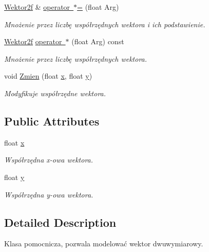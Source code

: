\begin{DoxyCompactItemize}
\mbox{\hyperlink{class_pz_g_1_1_wektor2f}{Wektor2f}} \& \mbox{\hyperlink{class_pz_g_1_1_wektor2f_aab3daec875a23c24b24cfc5d8fabb02b}{operator $\ast$=}} (float Arg)
\begin{DoxyCompactList}\small\item\em Mnożenie przez liczbę współrzędnych wektora i ich podstawienie. \end{DoxyCompactList}\item 
\mbox{\hyperlink{class_pz_g_1_1_wektor2f}{Wektor2f}} \mbox{\hyperlink{class_pz_g_1_1_wektor2f_a41c29776e710e4d6a88a61d2fed9aed4}{operator $\ast$}} (float Arg) const
\begin{DoxyCompactList}\small\item\em Mnożenie przez liczbę współrzędnych wektora. \end{DoxyCompactList}\item 
void \mbox{\hyperlink{class_pz_g_1_1_wektor2f_a2279ab3874a203d0a5b84d323c6876ec}{Zmien}} (float \mbox{\hyperlink{class_pz_g_1_1_wektor2f_aacbc07ae23c748a3378c09353b0b3c4c}{x}}, float \mbox{\hyperlink{class_pz_g_1_1_wektor2f_a7bea23077e29c234ff5b9fdc4f436fb8}{y}})
\begin{DoxyCompactList}\small\item\em Modyfikuje współrzędne wektora. \end{DoxyCompactList}\end{DoxyCompactItemize}
\subsection*{Public Attributes}
\begin{DoxyCompactItemize}
\item 
float \mbox{\hyperlink{class_pz_g_1_1_wektor2f_aacbc07ae23c748a3378c09353b0b3c4c}{x}}
\begin{DoxyCompactList}\small\item\em Współrzędna x-\/owa wektora. \end{DoxyCompactList}\item 
float \mbox{\hyperlink{class_pz_g_1_1_wektor2f_a7bea23077e29c234ff5b9fdc4f436fb8}{y}}
\begin{DoxyCompactList}\small\item\em Współrzędna y-\/owa wektora. \end{DoxyCompactList}\end{DoxyCompactItemize}


\subsection{Detailed Description}
Klasa pomocnicza, pozwala modelować wektor dwuwymiarowy. 

